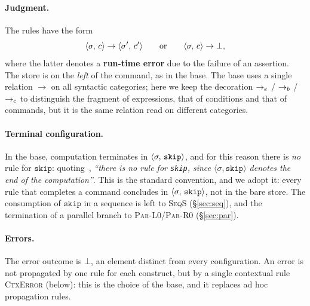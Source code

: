 \paragraph{Judgment.} The rules have the form
\[
\cfg{c}{\sigma} \to \cfg{c'}{\sigma'}
\qquad\text{or}\qquad
\cfg{c}{\sigma} \to \bot ,
\]
where the latter denotes a \textbf{run-time error} due to the failure of
an assertion. The store is on the \emph{left} of the command, as in the base.
The base uses a single relation $\to$ on all syntactic categories; here
we keep the decoration $\toe$ / $\tob$ / $\toc$ to distinguish the
fragment of expressions, that of conditions and that of commands,
but it is the same relation read on different categories.

\paragraph{Terminal configuration.} In the base, computation terminates in
$\cfg{\mathtt{skip}}{\sigma}$, and for this reason there is \emph{no} rule for
$\mathtt{skip}$: quoting~\cite{LamiLaneseStefani2024}, \emph{``there is no
rule for \textup{\texttt{skip}}, since $\langle \sigma, \mathtt{skip}\rangle$
denotes the end of the computation''}. This is the standard convention, and we
adopt it: every rule that completes a command concludes in
$\cfg{\mathtt{skip}}{\sigma}$, not in the bare store. The consumption of
$\mathtt{skip}$ in a sequence is left to \textsc{SeqS} (\S\ref{sec:seq}), and
the termination of a parallel branch to \textsc{Par-L0}/\textsc{Par-R0}
(\S\ref{sec:par}).

\paragraph{Errors.} The error outcome is $\bot$, an element distinct from every
configuration. An error is not propagated by one rule for each
construct, but by a single contextual rule \textsc{CtxError} (below): this is the
choice of the base, and it replaces ad hoc propagation rules.

